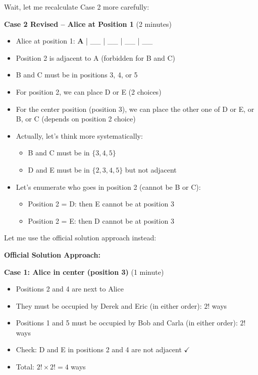 \documentclass[]{article}
\begin{document}
\begin{solutionbox}
Wait, let me recalculate Case 2 more carefully:

\textbf{Case 2 Revised -- Alice at Position 1} (2 minutes)
\begin{itemize}[leftmargin=*]
    \item Alice at position 1: \textbf{A} | \_\_ | \_\_ | \_\_ | \_\_
    \item Position 2 is adjacent to A (forbidden for B and C)
    \item B and C must be in positions 3, 4, or 5
    
    \item For position 2, we can place D or E (2 choices)
    \item For the center position (position 3), we can place the other one of D or E, or B, or C (depends on position 2 choice)
    
    \item Actually, let's think more systematically:
    \begin{itemize}
        \item B and C must be in $\{3, 4, 5\}$
        \item D and E must be in $\{2, 3, 4, 5\}$ but not adjacent
    \end{itemize}
    
    \item Let's enumerate who goes in position 2 (cannot be B or C):
    \begin{itemize}
        \item Position 2 = D: then E cannot be at position 3
        \item Position 2 = E: then D cannot be at position 3
    \end{itemize}
\end{itemize}

Let me use the official solution approach instead:

\textbf{Official Solution Approach:}

\textbf{Case 1: Alice in center (position 3)} (1 minute)
\begin{itemize}[leftmargin=*]
    \item Positions 2 and 4 are next to Alice
    \item They must be occupied by Derek and Eric (in either order): $2!$ ways
    \item Positions 1 and 5 must be occupied by Bob and Carla (in either order): $2!$ ways
    \item Check: D and E in positions 2 and 4 are not adjacent $\checkmark$
    \item Total: $2! \times 2! = \boxed{4}$ ways
\end{itemize}


\end{solutionbox}
\end{document}
